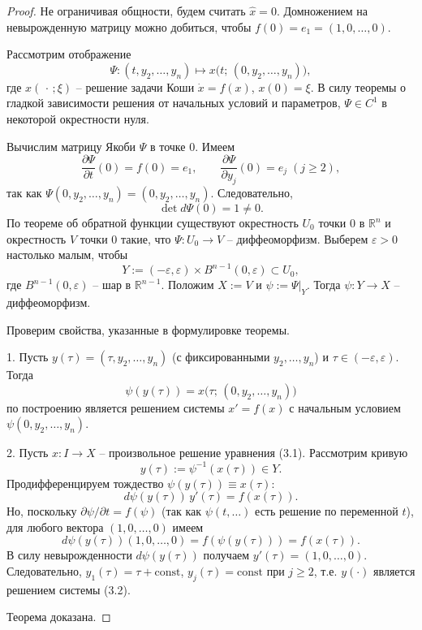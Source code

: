\begin{proof}
    Не ограничивая общности, будем считать \(\hat{x}=0\). Домножением на невырожденную матрицу можно добиться, чтобы \(f(0)=e_{1}=(1,0,\ldots,0)\).  

    Рассмотрим отображение  
    \[
    \Psi\colon (t,y_{2},\dots,y_{n})\mapsto x\bigl(t;\,(0,y_{2},\dots,y_{n})\bigr),
    \]
    где \(x(\,\cdot\,;\xi)\) – решение задачи Коши \(\dot{x}=f(x)\), \(x(0)=\xi\).  
    В силу теоремы о гладкой зависимости решения от начальных условий и параметров, \(\Psi\in C^{1}\) в некоторой окрестности нуля.

    Вычислим матрицу Якоби \(\Psi\) в точке \(0\). Имеем  
    \[
    \frac{\partial\Psi}{\partial t}(0)=f(0)=e_{1},\qquad 
    \frac{\partial\Psi}{\partial y_{j}}(0)=e_{j}\;(j\ge 2),
    \]
    так как \(\Psi(0,y_{2},\dots,y_{n})=(0,y_{2},\dots,y_{n})\). Следовательно,
    \[
    \det d\Psi(0)=1\neq 0.
    \]
    По теореме об обратной функции существуют окрестность \(U_{0}\) точки \(0\) в \(\mathbb{R}^{n}\) и окрестность \(V\) точки \(0\) такие, что \(\Psi\colon U_{0}\to V\) – диффеоморфизм.  
    Выберем \(\varepsilon>0\) настолько малым, чтобы  
    \[
    Y:=(-\varepsilon,\varepsilon)\times B^{n-1}(0,\varepsilon)\subset U_{0},
    \]
    где \(B^{n-1}(0,\varepsilon)\) – шар в \(\mathbb{R}^{n-1}\). Положим \(X:=V\) и \(\psi:=\Psi|_{Y}\). Тогда \(\psi\colon Y\to X\) – диффеоморфизм.

    Проверим свойства, указанные в формулировке теоремы.

    1. Пусть \(y(\tau)=(\tau,y_{2},\dots,y_{n})\) (с фиксированными \(y_{2},\dots,y_{n}\)) и \(\tau\in(-\varepsilon,\varepsilon)\). Тогда  
    \[
    \psi(y(\tau))=x\bigl(\tau;\,(0,y_{2},\dots,y_{n})\bigr)
    \]
    по построению является решением системы \(x'=f(x)\) с начальным условием \(\psi(0,y_{2},\dots,y_{n})\).

    2. Пусть \(x\colon I\to X\) – произвольное решение уравнения (3.1). Рассмотрим кривую  
    \[
    y(\tau):=\psi^{-1}(x(\tau))\in Y.
    \]
    Продифференцируем тождество \(\psi(y(\tau))\equiv x(\tau)\):
    \[
    d\psi(y(\tau))\,y'(\tau)=f(x(\tau)).
    \]
    Но, поскольку \(\partial\psi/\partial t = f(\psi)\) (так как \(\psi(t,\dots)\) есть решение по переменной \(t\)), для любого вектора \((1,0,\dots,0)\) имеем  
    \[
    d\psi(y(\tau))(1,0,\dots,0)=f(\psi(y(\tau)))=f(x(\tau)).
    \]
    В силу невырожденности \(d\psi(y(\tau))\) получаем \(y'(\tau)=(1,0,\dots,0)\).  
    Следовательно, \(y_{1}(\tau)=\tau+\text{const}\), \(y_{j}(\tau)=\text{const}\) при \(j\ge 2\), т.е. \(y(\cdot)\) является решением системы (3.2).

    Теорема доказана.
\end{proof}

